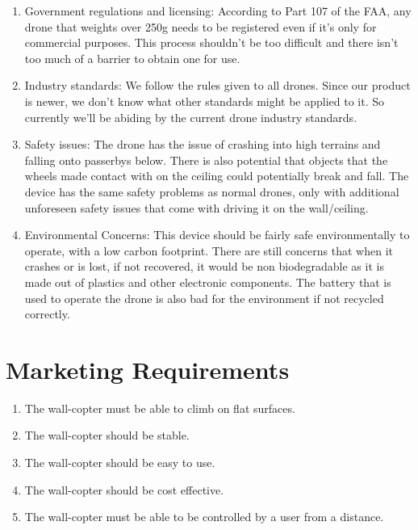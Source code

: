 \documentclass[12pt]{article}
\begin{document}
\begin{enumerate}[label=\Alph*.]
\begin{enumerate}[label=\roman*.]
                \item Government regulations and licensing: According to Part 107 of the FAA, any drone that weights over 250g needs to be registered even if it's only for commercial purposes. This process shouldn't be too difficult and there isn't too much of a barrier to obtain one for use.
                \item Industry standards: We follow the rules given to all drones. Since our product is newer, we don't know what other standards might be applied to it. So currently we'll be abiding by the current drone industry standards.
                \item Safety issues: The drone has the issue of crashing into high terrains and falling onto passerbys below. There is also potential that objects that the wheels made contact with on the ceiling could potentially break and fall. The device has the same safety problems as normal drones, only with additional unforeseen safety issues that come with driving it on the wall/ceiling.
                \item Environmental Concerns: This device should be fairly safe environmentally to operate, with a low carbon footprint. There are still concerns that when it crashes or is lost, if not recovered, it would be non biodegradable as it is made out of plastics and other electronic components. The battery that is used to operate the drone is also bad for the environment if not recycled correctly.
            \end{enumerate}
        \end{enumerate}
    \newpage

    \section{Marketing Requirements}
        \begin{enumerate}[label=\arabic*.]
            \item The wall-copter must be able to climb on flat surfaces.
            \item The wall-copter should be stable.
            \item The wall-copter should be easy to use.
            \item The wall-copter should be cost effective.
            \item The wall-copter must be able to be controlled by a user from a distance.
        \end{enumerate}
    
\end{document}
